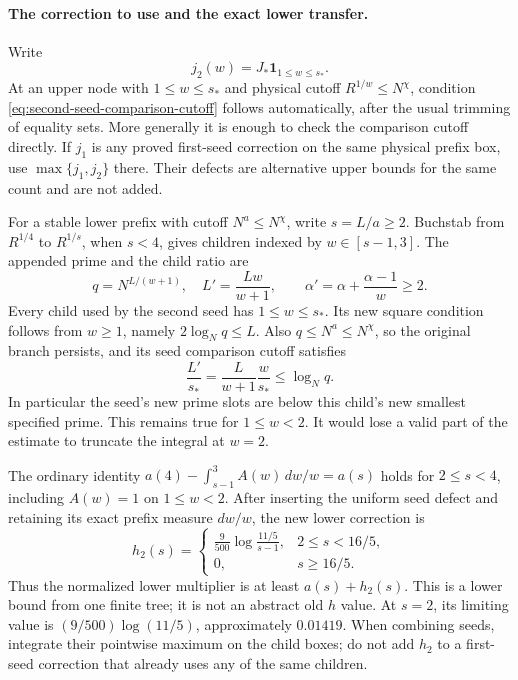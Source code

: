 \documentclass[11pt]{article}
\begin{document}
\paragraph{The correction to use and the exact lower transfer.}
Write
\[
 j_2(w)=J_*\mathbf1_{1\le w\le s_*}.
\]
At an upper node with $1\le w\le s_*$ and physical cutoff
$R^{1/w}\le N^\chi$, condition
\eqref{eq:second-seed-comparison-cutoff} follows automatically,
after the usual trimming of equality sets.  More generally it is
enough to check the comparison cutoff directly.  If $j_1$ is any
proved first-seed correction on the same physical prefix box, use
$\max\{j_1,j_2\}$ there.  Their defects are alternative upper
bounds for the same count and are not added.

For a stable lower prefix with cutoff $N^a\le N^\chi$, write
$s=L/a\ge2$.  Buchstab from $R^{1/4}$ to $R^{1/s}$, when $s<4$,
gives children indexed by $w\in[s-1,3]$.  The appended prime and
the child ratio are
\[
 q=N^{L/(w+1)},\quad L'=\frac{Lw}{w+1},\qquad
 \alpha'=\alpha+\frac{\alpha-1}{w}\ge2.
\]
Every child used by the second seed has $1\le w\le s_*$.
Its new square condition follows from $w\ge1$, namely
$2\log_Nq\le L$.  Also $q\le N^a\le N^\chi$, so the original
branch persists, and its seed comparison cutoff satisfies
\begin{equation}\label{eq:second-seed-child-cutoff}
 \frac{L'}{s_*}=\frac{L}{w+1}\frac{w}{s_*}
 \le\log_Nq.
\end{equation}
In particular the seed's new prime slots are below this child's
new smallest specified prime.  This remains true for $1\le w<2$.
It would lose a valid part of the estimate to truncate the integral
at $w=2$.

The ordinary identity
$a(4)-\int_{s-1}^3 A(w)\,dw/w=a(s)$ holds for $2\le s<4$,
including $A(w)=1$ on $1\le w<2$.  After inserting the uniform seed
defect and retaining its exact prefix measure $dw/w$, the new lower
correction is
\begin{equation}\label{eq:second-seed-stable-lower}
 h_2(s)=
 \begin{cases}
 \displaystyle\frac9{500}\log\frac{11/5}{s-1},&2\le s<16/5,\\
 0,&s\ge16/5.
 \end{cases}
\end{equation}
Thus the normalized lower multiplier is at least $a(s)+h_2(s)$.
This is a lower bound from one finite tree; it is not an abstract
old $h$ value.  At $s=2$, its limiting value is
$(9/500)\log(11/5)$, approximately $0.01419$.
When combining seeds, integrate their pointwise maximum on the
child boxes; do not add $h_2$ to a first-seed correction that already
uses any of the same children.
\end{document}
